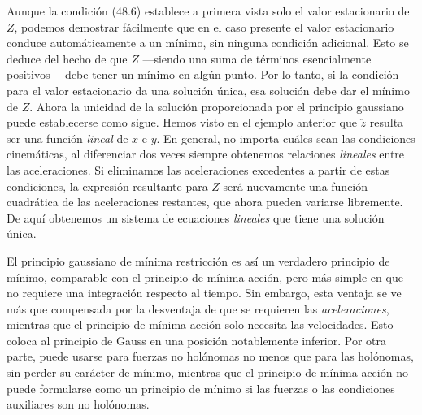 \documentclass[12pt,a4paper]{book}
\begin{document}
Aunque la condición (48.6) establece a primera vista solo el valor estacionario de $Z$, podemos demostrar fácilmente que en el caso presente el valor estacionario conduce automáticamente a un mínimo, sin ninguna condición adicional. Esto se deduce del hecho de que $Z$ ---siendo una suma de términos esencialmente positivos--- debe tener un mínimo en algún punto. Por lo tanto, si la condición para el valor estacionario da una solución única, esa solución debe dar el mínimo de $Z$. Ahora la unicidad de la solución proporcionada por el principio gaussiano puede establecerse como sigue. Hemos visto en el ejemplo anterior que $\ddot{z}$ resulta ser una función \textit{lineal} de $\ddot{x}$ e $\ddot{y}$. En general, no importa cuáles sean las condiciones cinemáticas, al diferenciar dos veces siempre obtenemos relaciones \textit{lineales} entre las aceleraciones. Si eliminamos las aceleraciones excedentes a partir de estas condiciones, la expresión resultante para $Z$ será nuevamente una función cuadrática de las aceleraciones restantes, que ahora pueden variarse libremente. De aquí obtenemos un sistema de ecuaciones \textit{lineales} que tiene una solución única.

El principio gaussiano de mínima restricción es así un verdadero principio de mínimo, comparable con el principio de mínima acción, pero más simple en que no requiere una integración respecto al tiempo. Sin embargo, esta ventaja se ve más que compensada por la desventaja de que se requieren las \textit{aceleraciones}, mientras que el principio de mínima acción solo necesita las velocidades. Esto coloca al principio de Gauss en una posición notablemente inferior. Por otra parte, puede usarse para fuerzas no holónomas no menos que para las holónomas, sin perder su carácter de mínimo, mientras que el principio de mínima acción no puede formularse como un principio de mínimo si las fuerzas o las condiciones auxiliares son no holónomas.
\end{document}
